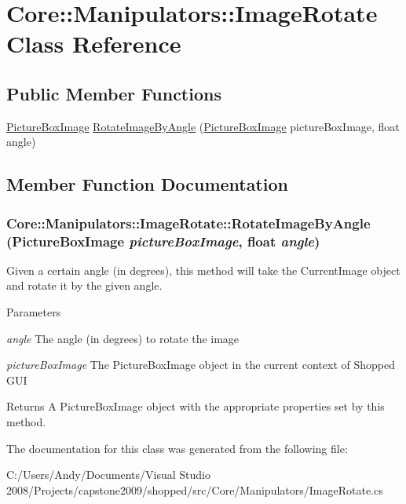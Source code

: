 \hypertarget{class_core_1_1_manipulators_1_1_image_rotate}{
\section{Core::Manipulators::ImageRotate Class Reference}
\label{class_core_1_1_manipulators_1_1_image_rotate}
}
\subsection*{Public Member Functions}
\begin{DoxyCompactItemize}
\item 
\hyperlink{class_core_1_1_images_1_1_picture_box_image}{PictureBoxImage} \hyperlink{class_core_1_1_manipulators_1_1_image_rotate_aac9a42f5c5811673d8a262f425ec3c79}{RotateImageByAngle} (\hyperlink{class_core_1_1_images_1_1_picture_box_image}{PictureBoxImage} pictureBoxImage, float angle)
\end{DoxyCompactItemize}


\subsection{Member Function Documentation}
\hypertarget{class_core_1_1_manipulators_1_1_image_rotate_aac9a42f5c5811673d8a262f425ec3c79}{
\subsubsection[{RotateImageByAngle}]{ Core::Manipulators::ImageRotate::RotateImageByAngle ({\bf PictureBoxImage} {\em pictureBoxImage}, \/  float {\em angle})}}
\label{class_core_1_1_manipulators_1_1_image_rotate_aac9a42f5c5811673d8a262f425ec3c79}
Given a certain angle (in degrees), this method will take the CurrentImage object and rotate it by the given angle.


\begin{DoxyParams}{Parameters}
\item[{\em angle}]The angle (in degrees) to rotate the image \item[{\em pictureBoxImage}]The PictureBoxImage object in the current context of Shopped GUI \end{DoxyParams}
\begin{DoxyReturn}{Returns}
A PictureBoxImage object with the appropriate properties set by this method. 
\end{DoxyReturn}


The documentation for this class was generated from the following file:\begin{DoxyCompactItemize}
\item 
C:/Users/Andy/Documents/Visual Studio 2008/Projects/capstone2009/shopped/src/Core/Manipulators/ImageRotate.cs\end{DoxyCompactItemize}
